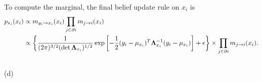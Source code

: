 \documentclass{article}
\newcommand{\s}[1]{\textsf{\textit{#1}}}
\begin{document}
To compute the marginal, the final belief update rule on $x_i$ is
\begin{align*}
	p_{\s{x}_i}(x_i) &\propto  m_{y_i\to x_i}(x_i) \prod_{j\in\partial{i}}m_{j\to i}(x_i)\\
	&\propto \left\{\frac{1}{(2\pi)^{3/2}(\det {\bf\Lambda}_{x_i})^{1/2}} \exp\left[-\frac{1}{2}(y_i-\mu_{x_i})^T\mathbf{\Lambda}^{-1}_{x_i}(y_i - \mu_{x_i})\right] + \epsilon\right\}
	\times \prod_{j\in\partial{i}}m_{j\to i}(x_i).
\end{align*}
\\

\noindent
(d)
\end{document}
